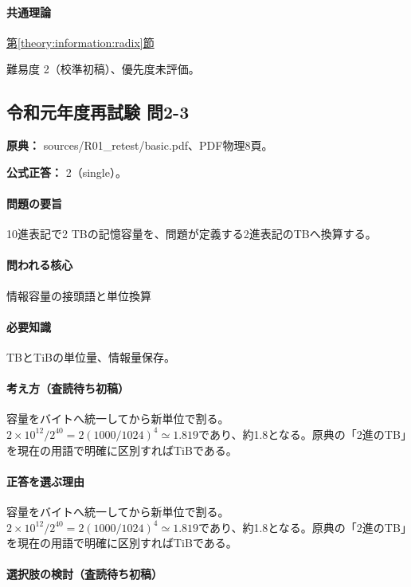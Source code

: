 \paragraph{共通理論} \hyperref[theory:information:radix]{第\ref*{theory:information:radix}節}

\par 難易度 2（校準初稿）、優先度未評価。

\subsection{令和元年度再試験 問2-3}
\label{q:r01-ret-basic-2-3}

\noindent\textbf{原典：} sources/R01\_retest/basic.pdf、PDF物理8頁。

\textbf{公式正答：} 2（single）。

\paragraph{問題の要旨} 10進表記で2 TBの記憶容量を、問題が定義する2進表記のTBへ換算する。

\paragraph{問われる核心} 情報容量の接頭語と単位換算

\paragraph{必要知識} TBとTiBの単位量、情報量保存。

\paragraph{考え方（査読待ち初稿）} 容量をバイトへ統一してから新単位で割る。\(2\times10^{12}/2^{40}=2(1000/1024)^4\simeq1.819\)であり、約1.8となる。原典の「2進のTB」を現在の用語で明確に区別すればTiBである。

\paragraph{正答を選ぶ理由} 容量をバイトへ統一してから新単位で割る。\(2\times10^{12}/2^{40}=2(1000/1024)^4\simeq1.819\)であり、約1.8となる。原典の「2進のTB」を現在の用語で明確に区別すればTiBである。

\paragraph{選択肢の検討（査読待ち初稿）}\mbox{}\par

